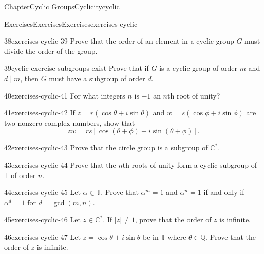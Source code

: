 \documentclass[oneside,10pt,]{book}
\numberwithin{equation}{section}
\begin{document}
\begin{chapterptx}{Chapter}{Cyclic Groups}{}{Cyclicity}{}{}{cyclic}
\begin{exercises-section}{Exercises}{Exercises}{}{Exercises}{}{}{exercises-cyclic}
\begin{divisionexercise}{38}{}{}{exercises-cyclic-39}
Prove that the order of an element in a cyclic group \(G\) must divide the order of the group.%
\end{divisionexercise}%
\begin{divisionexercise}{39}{}{}{cyclic-exercise-subgroups-exist}%
Prove that if \(G\) is a cyclic group of order \(m\) and \(d \mid m\), then \(G\) must have a subgroup of order \(d\).%
\end{divisionexercise}%
\begin{divisionexercise}{40}{}{}{exercises-cyclic-41}%
For what integers \(n\) is \(-1\) an \(n\)th root of unity?%
\end{divisionexercise}%
\begin{divisionexercise}{41}{}{}{exercises-cyclic-42}%
If \(z = r( \cos \theta + i \sin \theta)\) and \(w = s(\cos \phi + i \sin \phi)\) are two nonzero complex numbers, show that%
\begin{equation*}
zw = rs[ \cos( \theta + \phi)  + i \sin( \theta + \phi)].
\end{equation*}
%
\end{divisionexercise}%
\begin{divisionexercise}{42}{}{}{exercises-cyclic-43}%
Prove that the circle group is a subgroup of  \({\mathbb C}^*\).%
\end{divisionexercise}%
\begin{divisionexercise}{43}{}{}{exercises-cyclic-44}%
Prove that the \(n\)th roots of unity form a cyclic subgroup of \({\mathbb T}\)  of order \(n\).%
\end{divisionexercise}%
\begin{divisionexercise}{44}{}{}{exercises-cyclic-45}%
Let \(\alpha \in \mathbb T\). Prove that \(\alpha^m =1\) and \(\alpha^n = 1\) if and only if \(\alpha^d = 1\) for \(d = \gcd(m,n)\).%
\end{divisionexercise}%
\begin{divisionexercise}{45}{}{}{exercises-cyclic-46}%
Let \(z \in {\mathbb C}^\ast\). If \(|z| \neq 1\), prove that the order of \(z\) is infinite.%
\end{divisionexercise}%
\begin{divisionexercise}{46}{}{}{exercises-cyclic-47}%
Let \(z =\cos \theta + i \sin \theta\) be in \({\mathbb T}\) where \(\theta \in {\mathbb Q}\).  Prove that the order of \(z\)  is infinite.%
\end{divisionexercise}%
\end{exercises-section}
%
%
\typeout{************************************************}

\end{chapterptx}
\end{document}
